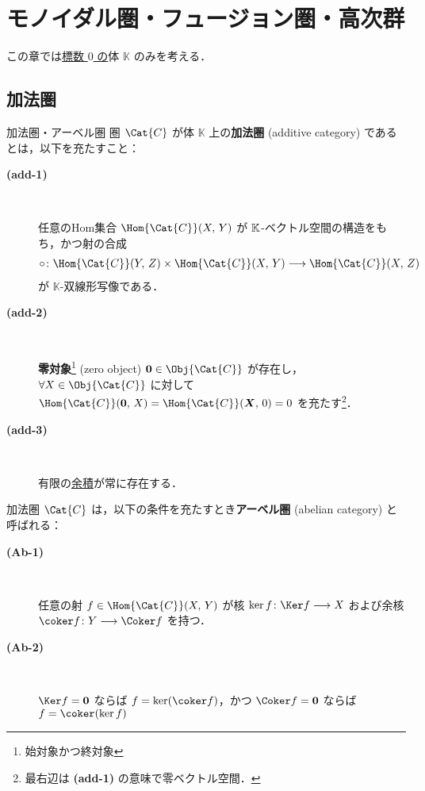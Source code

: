 \documentclass[TQFT_main]{subfiles}
\begin{document}
\chapter{モノイダル圏・フュージョン圏・高次群}

この章では\underline{標数 $0$ の}体 $\mathbb{K}$ のみを考える．

\section{加法圏}

\begin{mydef}[label=def:additive-cat]{加法圏・アーベル圏}
    圏 $\Cat{C}$ が体 $\mathbb{K}$ 上の\textbf{加法圏} (additive category) であるとは，以下を充たすこと：
    \begin{description}
        \item[\textbf{(add-1)}]　
        
        任意のHom集合 $\Hom{\Cat{C}}(X,\, Y)$ が $\mathbb{K}$-ベクトル空間の構造をもち，かつ射の合成
        \begin{align}
            \circ \colon \Hom{\Cat{C}}(Y,\, Z) \times \Hom{\Cat{C}}(X,\, Y) \lto \Hom{\Cat{C}}(X,\, Z)
        \end{align}
        が $\mathbb{K}$-双線形写像である．

        \item[\textbf{(add-2)}]　
        
        \textbf{零対象}\footnote{始対象かつ終対象} (zero object) $\bm{0} \in \Obj{\Cat{C}}$ が存在し，$\forall X \in \Obj{\Cat{C}}$ に対して $\Hom{\Cat{C}}(\bm{0},\, X) = \Hom{\Cat{C}}(\bm{X},\, 0) = 0$ を充たす\footnote{最右辺は \textsf{\textbf{(add-1)}} の意味で零ベクトル空間．}．

        \item[\textbf{(add-3)}]　
        
        有限の\hyperref[def:product-coproduct]{余積}が常に存在する．
    \end{description}
    
    \tcblower

    加法圏 $\Cat{C}$ は，以下の条件を充たすとき\textbf{アーベル圏} (abelian category) と呼ばれる：
    \begin{description}
        \item[\textbf{(Ab-1)}]　
        
        任意の射 $f \in \Hom{\Cat{C}}(X,\, Y)$ が核 $\ker f \colon \Ker f \lto X$ および余核 $\coker f \colon Y \lto \Coker f$ を持つ．

        \item[\textbf{(Ab-2)}]　
        
        $\Ker f = \bm{0}$ ならば $f = \ker (\coker f)$，かつ $\Coker f = \bm{0}$ ならば $f = \coker (\ker f)$
    \end{description}
    
\end{mydef}
\end{document}
